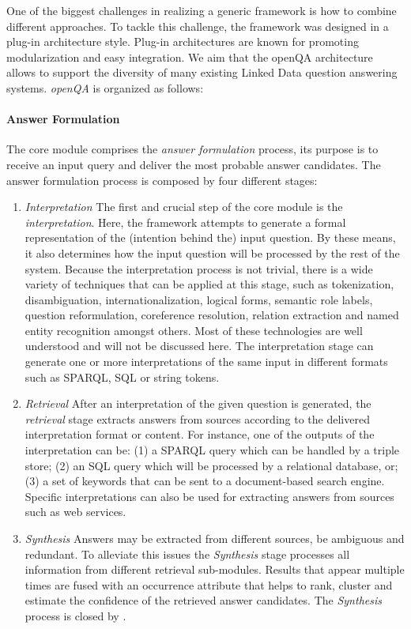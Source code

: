 \documentclass{acm_proc_article-sp}
\begin{document}
One of the biggest challenges in realizing a generic framework is how to combine different approaches.
To tackle this challenge, the framework was designed in a plug-in architecture style.
Plug-in architectures are known for promoting modularization and easy integration.
We aim that the openQA architecture allows to support the diversity of many existing Linked Data question answering systems. %
\emph{openQA} is organized as follows:
\vspace{-4.0mm}
\paragraph{\textbf{Answer Formulation}} The core module comprises the \emph{answer formulation} process, its purpose is to receive an input query and deliver the most probable answer candidates.
The answer formulation process is composed by four different stages:
\vspace{-3.0mm}
\begin{enumerate}
	\item \emph{Interpretation} The first and crucial step of the core module is the \emph{interpretation}. 
	Here, the framework attempts to generate a formal representation of the (intention behind the) input question.
	By these means, it also determines how the input question will be processed by the rest of the system.	
	Because the interpretation process is not trivial, there is a wide variety of techniques that can be applied at this stage, such as tokenization, disambiguation, internationalization, logical forms, semantic role labels, question reformulation, coreference resolution, relation extraction and named entity recognition amongst others.
	Most of these technologies are well understood and will not be discussed here.
	The interpretation stage can generate one or more interpretations of the same input in different formats such as SPARQL, SQL or string tokens.
	\item \emph{Retrieval} After an interpretation of the given question is generated, the \emph{retrieval} stage extracts answers from sources according to the delivered interpretation format or content.
	For instance, one of the outputs of the interpretation can be: 
	(1) a SPARQL query which can be handled by a triple store;
	(2) an SQL query which will be processed by a relational database, or;
	(3) a set of keywords that can be sent to a document-based search engine.
	Specific interpretations can also be used for extracting answers from sources such as web services.		
	\item \emph{Synthesis} %
	Answers may be extracted from different sources, be ambiguous and redundant.
	To alleviate this issues the \emph{Synthesis} stage processes all information from different retrieval sub-modules.
	Results that appear multiple times are fused with an occurrence attribute that helps to rank, cluster and estimate the confidence of the retrieved answer candidates.
	The \emph{Synthesis} process is closed by \textit{}.

\end{enumerate}
\end{document}
